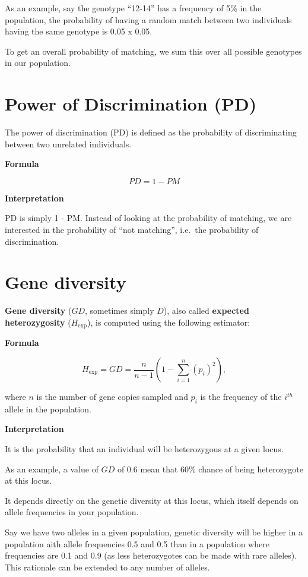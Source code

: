 \documentclass[
]{book}
\begin{document}
As an example, say the genotype ``12-14'' has a frequency of 5\% in the population, the probability of
having a random match between two individuals having the same genotype is 0.05 x 0.05.

To get an overall probability of matching, we sum this over all possible genotypes
in our population.

\hypertarget{power-of-discrimination-pd}{%
\section{Power of Discrimination (PD)}\label{power-of-discrimination-pd}}

The power of discrimination (PD) is defined as the probability of
discriminating between two unrelated individuals.

\textbf{Formula}

\[
PD = 1 - PM
\]

\textbf{Interpretation}

PD is simply 1 - PM. Instead of looking at the probability of matching, we are
interested in the probability of ``not matching'', i.e.~the probability of discrimination.

\hypertarget{gene-diversity}{%
\section{Gene diversity}\label{gene-diversity}}

\textbf{Gene diversity} (\(GD\), sometimes simply \(D\)), also called \textbf{expected heterozygosity}
(\(H_{\mathrm{exp}}\)), is computed using the following estimator:

\textbf{Formula}

\[
  H_{\mathrm{exp}} = GD = \frac{n}{n - 1} \left( 1 - \sum_{i=1}^{n}(p_i)^2 \right),
\]

where \(n\) is the number of gene copies sampled and \(p_i\) is the
frequency of the \(i^{th}\) allele in the population.

\textbf{Interpretation}

It is the probability that an individual will be heterozygous at a given locus.

As an example, a value of \(GD\) of 0.6 mean that 60\% chance of being
heterozygote at this locus.

It depends directly on the genetic diversity at this locus, which itself depends on
allele frequencies in your population.

Say we have two alleles in a given population, genetic diversity will be higher
in a population aith allele frequencies 0.5 and 0.5 than in a population where
frequencies are 0.1 and 0.9 (as less heterozygotes can be made with rare
alleles). This rationale can be extended to any number of alleles.
\end{document}
